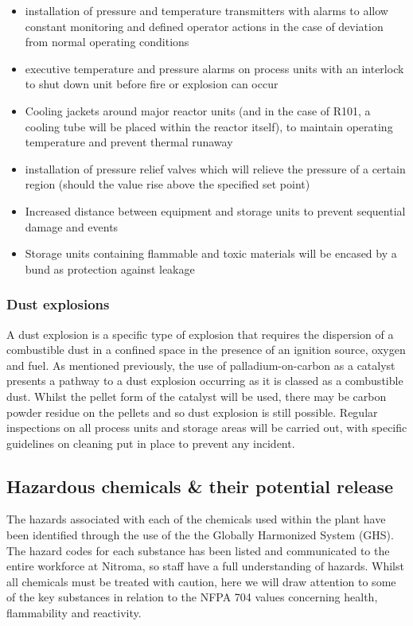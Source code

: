 \begin{itemize}
\item installation of pressure and temperature transmitters with alarms to allow constant monitoring and defined operator actions in the case of deviation from normal operating conditions
         \item executive temperature and pressure alarms on process units with an interlock to shut down unit before fire or explosion can occur 
         \item Cooling jackets around major reactor units (and in the case of R101, a cooling tube will be placed within the reactor itself), to maintain operating temperature and prevent thermal runaway 
          \item installation of pressure relief valves which will relieve the pressure of a certain region (should the value rise above the specified set point)
    \item Increased distance between equipment and storage units to prevent sequential damage and events
    \item Storage units containing flammable and toxic materials will be encased by a bund as protection against leakage
\end{itemize}


\subsubsection{Dust explosions}

A dust explosion is a specific type of explosion that requires the dispersion of a combustible dust in a confined space in the presence of an ignition source, oxygen and fuel. As mentioned previously, the use of palladium-on-carbon as a catalyst presents a pathway to a dust explosion occurring as it is classed as a combustible dust. Whilst the pellet form of the catalyst will be used, there may be carbon powder residue on the pellets and so dust explosion is still possible. Regular inspections on all process units and storage areas will be carried out, with specific guidelines on cleaning put in place to prevent any incident. 



\subsection{Hazardous chemicals \& their potential release}

The hazards associated with each of the chemicals used within the plant have  been identified through the use of the the Globally Harmonized System (GHS). The hazard codes for each substance has been listed and communicated to the entire workforce at Nitroma, so staff have a full understanding of hazards. Whilst all chemicals must be treated with caution, here we will draw attention to some of the key substances in relation to the NFPA 704 values concerning health, flammability and reactivity. 

